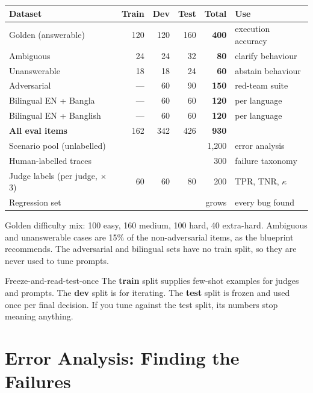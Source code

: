 \documentclass[11pt,a4paper]{article}
\begin{document}
\begin{center}
\small
\begin{tabular}{@{}l r r r r l@{}}
\toprule
\textbf{Dataset} & \textbf{Train} & \textbf{Dev} & \textbf{Test} & \textbf{Total} & \textbf{Use}\\
\midrule
Golden (answerable) & 120 & 120 & 160 & \textbf{400} & execution accuracy\\
Ambiguous & 24 & 24 & 32 & \textbf{80} & clarify behaviour\\
Unanswerable & 18 & 18 & 24 & \textbf{60} & abstain behaviour\\
Adversarial & --- & 60 & 90 & \textbf{150} & red-team suite\\
Bilingual EN + Bangla & --- & 60 & 60 & \textbf{120} & per language\\
Bilingual EN + Banglish & --- & 60 & 60 & \textbf{120} & per language\\
\midrule
\textbf{All eval items} & 162 & 342 & 426 & \textbf{930} & \\
\midrule
Scenario pool (unlabelled) & & & & 1{,}200 & error analysis\\
Human-labelled traces & & & & 300 & failure taxonomy\\
Judge labels (per judge, $\times$3) & 60 & 60 & 80 & 200 & TPR, TNR, $\kappa$\\
Regression set & & & & grows & every bug found\\
\bottomrule
\end{tabular}

{\footnotesize\color{grey} Golden difficulty mix: 100 easy, 160 medium, 100 hard, 40 extra-hard. Ambiguous and unanswerable cases are 15\% of the non-adversarial items, as the
blueprint recommends. The adversarial and bilingual sets have no train split, so they are never used
to tune prompts.}
\end{center}

\begin{warnbox}{Freeze-and-read-test-once}
The \textbf{train} split supplies few-shot examples for judges and prompts. The \textbf{dev} split
is for iterating. The \textbf{test} split is frozen and used once per final decision. If you tune
against the test split, its numbers stop meaning anything.
\end{warnbox}

\section{Error Analysis: Finding the Failures}
\end{document}
